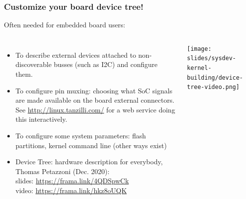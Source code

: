 \begin{frame}
  \frametitle{Customize your board device tree!}
  Often needed for embedded board users:
  \begin{columns}
       \begin{itemize}
       \item To describe external devices attached to non-discoverable
             busses (such as I2C) and configure them.
       \item To configure pin muxing: choosing what SoC signals are
	     made available on the board external connectors.
	     See \url{http://linux.tanzilli.com/} for a web service doing this
	     interactively.
       \item To configure some system parameters: flash partitions,
	     kernel command line (other ways exist)
       \item Device Tree: hardware description for everybody, Thomas Petazzoni (Dec. 2020):\\
             slides: \url{https://frama.link/4QDSpwCk}\\
	     video: \url{https://frama.link/hkz8oUQK}
       \end{itemize}
    \texttt{[image: slides/sysdev-kernel-building/device-tree-video.png]}
  \end{columns}
\end{frame}

